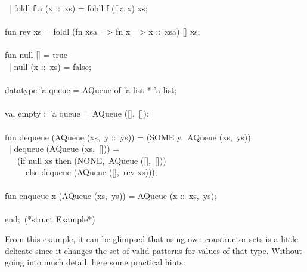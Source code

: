 \begin{isabellebody}
\begin{isamarkuptext}
\hspace*{0pt} ~| foldl f a (x ::~xs) = foldl f (f a x) xs;\\
\hspace*{0pt}\\
\hspace*{0pt}fun rev xs = foldl (fn xsa => fn x => x ::~xsa) [] xs;\\
\hspace*{0pt}\\
\hspace*{0pt}fun null [] = true\\
\hspace*{0pt} ~| null (x ::~xs) = false;\\
\hspace*{0pt}\\
\hspace*{0pt}datatype 'a queue = AQueue of 'a list * 'a list;\\
\hspace*{0pt}\\
\hspace*{0pt}val empty :~'a queue = AQueue ([],~[]);\\
\hspace*{0pt}\\
\hspace*{0pt}fun dequeue (AQueue (xs,~y ::~ys)) = (SOME y,~AQueue (xs,~ys))\\
\hspace*{0pt} ~| dequeue (AQueue (xs,~[])) =\\
\hspace*{0pt} ~~~(if null xs then (NONE,~AQueue ([],~[]))\\
\hspace*{0pt} ~~~~~else dequeue (AQueue ([],~rev xs)));\\
\hspace*{0pt}\\
\hspace*{0pt}fun enqueue x (AQueue (xs,~ys)) = AQueue (x ::~xs,~ys);\\
\hspace*{0pt}\\
\hspace*{0pt}end;~(*struct Example*)%
\end{isamarkuptext}%
\isamarkuptrue%
%
\endisatagquote
{\isafoldquote}%
%
\isadelimquote
%
\endisadelimquote
%
\begin{isamarkuptext}%
\noindent From this example, it can be glimpsed that using own
  constructor sets is a little delicate since it changes the set of
  valid patterns for values of that type.  Without going into much
  detail, here some practical hints:


\end{isamarkuptext}
\end{isabellebody}
